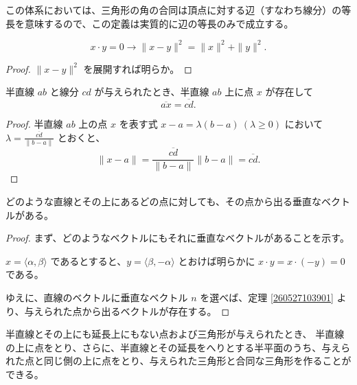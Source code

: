 \begin{col*}
  この体系においては、三角形の角の合同は頂点に対する辺（すなわち線分）の等長を意味するので、この定義は実質的に辺の等長のみで成立する。
\end{col*}


\begin{lmm}\label{260424041701}
  \[x\cdot y=0\rightarrow\|x-y\|^2=\|x\|^2+\|y\|^2.\]
\end{lmm}

\begin{proof}
  \(\|x-y\|^2\) を展開すれば明らか。
\end{proof}


\begin{lmm}\label{260424041702}
  半直線 \(ab\) と線分 \(cd\) が与えられたとき、半直線 \(ab\) 上に点 \(x\) が存在して
  \[\overline{ax}=\overline{cd}.\]
\end{lmm}

\begin{proof}
  半直線 \(ab\) 上の点 \(x\) を表す式 \(x-a=\lambda(b-a)\ (\lambda\geq 0)\) において \(\displaystyle \lambda=\frac{\overline{cd}}{\|b-a\|}\) とおくと、
  \[\|x-a\|=\frac{\overline{cd}}{\|b-a\|}\|b-a\|=\overline{cd}.\]
\end{proof}


\begin{lmm}\label{260424041703}
  どのような直線とその上にあるどの点に対しても、その点から出る垂直なベクトルがある。
\end{lmm}

\begin{proof}
  まず、どのようなベクトルにもそれに垂直なベクトルがあることを示す。

  \(x=\langle\alpha,\beta\rangle\) であるとすると、\(y=\langle\beta,-\alpha\rangle\) とおけば明らかに \(x\cdot y=x\cdot(-y)=0\) である。

  ゆえに、直線のベクトルに垂直なベクトル \(n\) を選べば、定理 \ref{260527103901} より、与えられた点から出るベクトルが存在する。
\end{proof}


\begin{semi}[三角形の移動の公理]
  半直線とその上にも延長上にもない点および三角形が与えられたとき、
  半直線の上に点をとり、さらに、半直線とその延長をへりとする半平面のうち、与えられた点と同じ側の上に点をとり、与えられた三角形と合同な三角形を作ることができる。
\end{semi}

